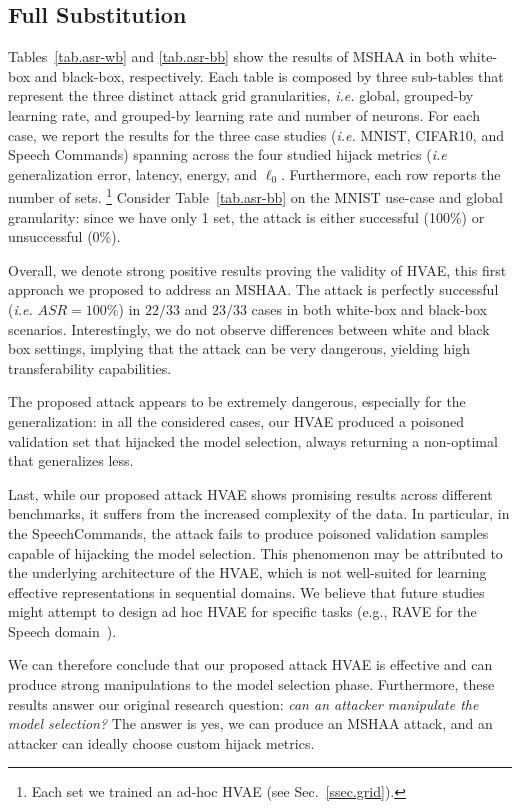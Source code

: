 \subsection{Full Substitution}
Tables~\ref{tab.asr-wb} and \ref{tab.asr-bb} show the results of MSHAA in both white-box and black-box, respectively. Each table is composed by three sub-tables that represent the three distinct attack grid granularities,  \textit{i.e.} global, grouped-by learning rate, and grouped-by learning rate and number of neurons. For each case, we report the results for the three case studies (\textit{i.e.} MNIST, CIFAR10, and Speech Commands) spanning across the four studied hijack metrics (\textit{i.e} generalization error, latency, energy, and $\ell_0$. 
Furthermore, each row reports the number of sets. \footnote{Each set we trained an ad-hoc HVAE (see Sec.~\ref{ssec.grid}).} Consider Table~\ref{tab.asr-bb} on the MNIST use-case and global granularity: since we have only 1 set, the attack is either successful (100\%) or unsuccessful (0\%).
\par
Overall, we denote strong positive results proving the validity of HVAE, this first approach we proposed to address an MSHAA. 
The attack is perfectly successful (\textit{i.e.} $ASR = 100\%$) in $22/33$ and $23/33$ cases in both white-box and black-box scenarios.
Interestingly, we do not observe differences between white and black box settings, implying that the attack can be very dangerous, yielding high transferability capabilities. 
\par
The proposed attack appears to be extremely dangerous, especially for the generalization: in all the considered cases, our HVAE produced a poisoned validation set that hijacked the model selection, always returning a non-optimal that generalizes less. 
\par
Last, while our proposed attack HVAE shows promising results across different benchmarks, it suffers from the increased complexity of the data. In particular, in the SpeechCommands, the attack fails to produce poisoned validation samples capable of hijacking the model selection.   
This phenomenon may be attributed to the underlying architecture of the HVAE, which is not well-suited for learning effective representations in sequential domains.
We believe that future studies might attempt to design ad hoc HVAE for specific tasks (e.g., RAVE for the Speech domain~\cite{caillon2021rave}).
\par
We can therefore conclude that our proposed attack HVAE is effective and can produce strong manipulations to the model selection phase. Furthermore, these results answer our original research question: \textit{can an attacker manipulate the model selection?} The answer is yes, we can produce an MSHAA attack, and an attacker can ideally choose custom hijack metrics.  

